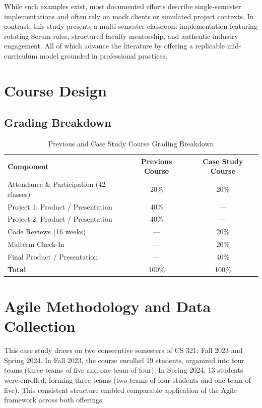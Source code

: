 \documentclass{article}
\begin{document}
While such examples exist, most documented efforts describe single-semester implementations and often rely on mock clients or simulated project contexts. In contrast, this study presents a multi-semester classroom implementation featuring rotating Scrum roles, structured faculty mentorship, and authentic industry engagement. All of which advance the literature by offering a replicable mid-curriculum model grounded in professional practices.

\section{Course Design}

\subsection{Grading Breakdown}

\begin{table}[ht]
  \centering
  \tiny
\caption{Previous and Case Study Course Grading Breakdown}
\label{tab:grading}
\begin{tabular}{lcc}
\hline
\textbf{Component} & \textbf{Previous Course} & \textbf{Case Study Course} \\
\hline
Attendance \& Participation (42 classes) & 20\% & 20\% \\
Project 1: Product / Presentation & 40\% & --- \\
Project 2: Product / Presentation & 40\% & --- \\
Code Reviews (16 weeks) & --- & 20\% \\
Midterm Check-In & --- & 20\% \\
Final Product / Presentation & --- & 40\% \\
\hline
\textbf{Total} & 100\% & 100\% \\
\hline
\end{tabular}
\end{table}

\section{Agile Methodology and Data Collection}
This case study draws on two consecutive semesters of CS 321: Fall 2023 and Spring 2024. In Fall 2023, the course enrolled 19 students, organized into four teams (three teams of five and one team of four). In Spring 2024, 13 students were enrolled, forming three teams (two teams of four students and one team of five). This consistent structure enabled comparable application of the Agile framework across both offerings.
\end{document}
